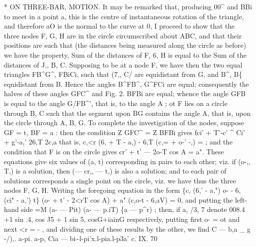 \documentclass[12pt,a4paper]{article}
\begin{document}
*
ON THREE-BAR, MOTION.
It may be
remarked
that,
producing
00\textasciicircum{}
and BBi
to meet
in
a
point
a, this
is
the
centre
of instantaneous rotation of
the
triangle, and
therefore aO
is
the normal
to
the curve at
0,
I
proceed
to
show
that
the
three
nodes
F,
G, H
are
in
the
circle
circumscribed
about ABC, and
that
their
positions are such that (the distances being measured along
the
circle
as
before) we
have the property, Sum
of
the
distances
of F,
6, H
is
equal
to the Sum of the distances of J., B,
C.
Supposing
to
be
at
a
node
F,
we
have
then
the
two
equal
triangles
FB\textasciicircum{}G\textasciicircum{},
FBiCi, such
that
(7,, C/ are equidistant from
G, and B\textasciicircum{}, B\{ equidistant from
B.
Hence
the
angles
B\textasciicircum{}FB\textasciicircum{}, G\textasciicircum{}FCi
are
equal;
consequently
the halves of
these angles GFC\textasciicircum{}
and
Fig.
2.
BFBi
are
equal; whence the angle GFB
is
equal
to
the
angle G/FB\textasciicircum{}', that
is,
to
the
angle A
;
ot F
lies
on
a
circle
through B, C such
that
the segment upon BG contains
the angle A, that
is, upon
the
circle
through
A, B,
G.
To complete
the
investigation
of the
nodes, suppose GF = t, BF = a
:
then the condition
Z GFC\textasciicircum{} = Z BFBi
gives
fci' + T'-c' \textasciicircum{}
Ci' + g'-a,'
26,T
2c,a
that
is,
c,<r (6,\guillemotright{} + T\guillemotright{} - a,\guillemotright{}) - 6,T (c,= + o-' -\guillemotleft{},\guillemotright{}) =
;
and the condition that F is on the
circle gives
cr' + t' --- 2o-T cos A = a".
These
equations
give
six
values of
(a,
t) corresponding
in
pairs
to
each other;
viz.
if
(o-,,
T,)
is
a
solution, then
(--- cr,, --- t,)
is
also a
solution;
and
to each
pair of solutions
corresponds a single point on the
circle,
viz. we have thus
the three nodes F,
G, H.
Writing the
foregoing equation in the form
\{c, (6,' - a,") o- - 6, (ci" - a,') t\} (o-\guillemotright{} + t' - 2<rT cos A) + a" (c,o-t\guillemotright{} - 6,aV) = 0,
and
putting
the
left-hand
side =M (a- --- Pit) (a- --- p.iT) \{a --- p\textasciicircum{}r)
;
then,
if
a,
/3, 7
denote
008.4 +1 sin .4,
cos J5 + 1 sin 5, cosG+iainG
respectively,
putting
first
o- = ot
and
next
<r = -
, and
dividing
one
of
these
results
by
the
other, we
find
C --- b,a \_
g -/),. a-pi. a-p,
Cia --- bi\textasciitilde{}l-pi'x.l-pia.l-p3a'
c.
IX.
70
\end{document}
